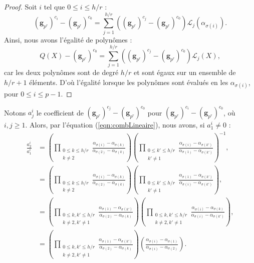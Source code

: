 \documentclass[a4paper, titlepage, 11pt]{article}
\theoremstyle{definition}
\theoremstyle{remark}
\def\mbf #1{\mathbf{#1}}
\begin{document}
\begin{proof}
Soit $i$ tel que $0 \leqslant i \leqslant {h/r}$ :
$$(\mbf g_{p^r})^{c_i} - (\mbf g_{p^r})^{c_{0}} = \sum_{j=1}^{h/r} \left((\mbf g_{p^r})^{c_{j}} - (\mbf g_{p^r})^{c_{0}} \right)\mathcal L_j(\alpha_{\sigma(i)}).$$
Ainsi, nous avons l'égalité de polynômes :
$$Q(X) - (\mbf g_{p^r})^{c_{0}} = \sum_{j=1}^{h/r} \left((\mbf g_{p^r})^{c_{j}} - (\mbf g_{p^r})^{c_{0}} \right)\mathcal L_j(X),$$
car les deux polynômes sont de degré $h/r$ et sont égaux sur un ensemble de $h/r + 1$ éléments. D'où l'égalité lorsque les polynômes sont évalués en les $\alpha_{\sigma(i)}$, pour $0\leqslant i \leqslant p-1$.\end{proof}

Notons $a_j^i$ le coefficient de $(\mbf g_{p^r})^{c_{{j}}} - (\mbf g_{p^r})^{c_{0}}$ pour $(\mbf g_{p^r})^{c_{i}} - (\mbf g_{p^r})^{c_{0}}$, où $i , j\geqslant 1$. Alors, par l'équation (\ref{eqn:combLineaire}), nous avons, si $a_1^i \neq 0$ :
\begin{align*}
\frac{a_2^i}{a_1^i} &= \left(\prod_{\substack{0\leqslant k\leqslant h/r \\ k \neq 2}} \frac{\alpha_{\sigma(i)}-\alpha_{\sigma(k)}}{\alpha_{\sigma(2)}-\alpha_{\sigma(k)}} \right)\left(\prod_{\substack{0\leqslant k'\leqslant h/r \\ k' \neq 1}} \frac{\alpha_{\sigma(i)}-\alpha_{\sigma({k'})}}{\alpha_{\sigma(1)}-\alpha_{\sigma({k'})}} \right)^{-1}, \\
&= \left(\prod_{\substack{0\leqslant k\leqslant h/r \\ k \neq 2}} \frac{\alpha_{\sigma(i)}-\alpha_{\sigma(k)}}{\alpha_{\sigma(2)}-\alpha_{\sigma(k)}} \right)\left(\prod_{\substack{0\leqslant k' \leqslant h/r \\ k' \neq 1}} \frac{\alpha_{\sigma(1)}-\alpha_{\sigma({k'})}}{\alpha_{\sigma(i)}-\alpha_{\sigma({k'})}} \right), \\
&= \left(\prod_{\substack{0\leqslant k, k'\leqslant h/r \\ k \neq 2, k' \neq 1}} \frac{\alpha_{\sigma(1)}-\alpha_{\sigma({k'})}}{\alpha_{\sigma(2)}-\alpha_{\sigma(k)}} \right) \left(\prod_{\substack{0\leqslant k, k'\leqslant h/r \\ k \neq 2, k' \neq 1}} \frac{\alpha_{\sigma(i)}-\alpha_{\sigma(k)}}{\alpha_{\sigma(i)}-\alpha_{\sigma({k'})}} \right), \\
&= \left(\prod_{\substack{0\leqslant k, k'\leqslant h/r \\ k \neq 2, k' \neq 1}} \frac{\alpha_{\sigma(1)}-\alpha_{\sigma({k'})}}{\alpha_{\sigma(2)}-\alpha_{\sigma(k)}} \right) \left(\frac{\alpha_{\sigma(i)}-\alpha_{\sigma(1)}}{\alpha_{\sigma(i)}-\alpha_{\sigma(2)}} \right). \\
\end{align*}
\end{document}
